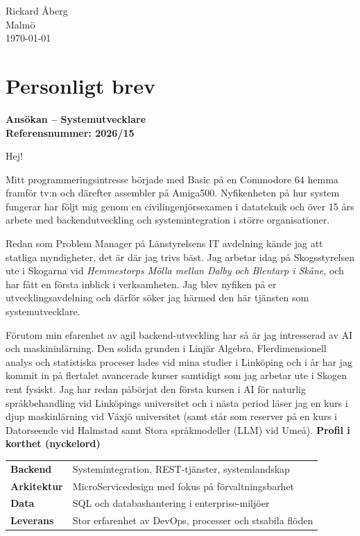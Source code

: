 \documentclass[11pt,a4paper]{article}
\begin{document}
\begin{flushright}
Rickard Åberg \\
Malmö \\
\today
\end{flushright}

\vspace{1cm}

\section*{Personligt brev}

\textbf{Ansökan – Systemutvecklare} \\
\textbf{Referensnummer: 2026/15}

\vspace{0.5em}
Hej!

Mitt programmeringsintresse började med Basic på en Commodore 64 hemma framför tv:n och därefter assembler på Amiga500. Nyfikenheten på hur system fungerar har följt mig genom en civilingenjörsexamen i datateknik och över 15 års arbete med backendutveckling och systemintegration i större organisationer.

Redan som Problem Manager på Länstyrelsens IT avdelning kände jag att statliga myndigheter, det är där jag trivs bäst. 
Jag arbetar idag på Skogsstyrelsen ute i Skogarna vid \textit{Hemmestorps Mölla mellan Dalby och Blentarp i Skåne}, och har fått en första inblick i verksamheten. Jag blev nyfiken på er utvecklingsavdelning och därför söker jag härmed den här tjänsten som systemutvecklare.

Förutom min efarenhet av agil backend-utveckling har så är jag intresserad av AI och maskininlärning.  
Den solida grunden i Linjär Algebra, Flerdimensionell analys och statistiska proceser lades vid mina studier i Linköping och i år har jag kommit in på flertalet avancerade kurser samtidigt som jag arbetar ute i Skogen rent fysiskt.  Jag har redan påbörjat den första kursen i AI för naturlig språkbehandling vid Linköpings universitet och i nästa period läser jag en kurs i djup maskinlärning vid Växjö universitet (samt står som reserver på en kurs i Datorseende vid Halmstad samt Stora språkmodeller (LLM) vid Umeå).
\vspace{0.4em}
\noindent\textbf{Profil i korthet (nyckelord)}
\vspace{0.2em}

\noindent\begin{tabularx}{\linewidth}{@{}lX@{}}
\textbf{Backend} & Systemintegration, REST-tjänster, systemlandskap \\
\textbf{Arkitektur} & MicroServicedesign med fokus på förvaltningsbarhet \\
\textbf{Data} & SQL och databashantering i enterprise-miljöer \\
\textbf{Leverans} & Stor erfarenhet av DevOps, processer och stsabila flöden \\
\end{tabularx}
\end{document}
